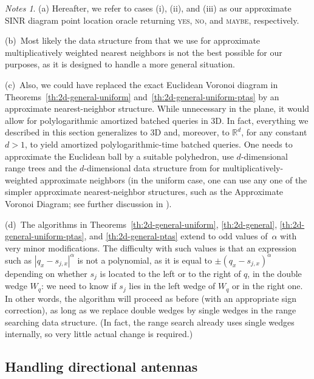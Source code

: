 \documentclass[11pt]{article}
\theoremstyle{remark}
\newtheorem*{notes}{Notes}
\newcommand{\Reals}{{\mathbb R}}
\begin{document}
\begin{notes}
  (a) Hereafter, we refer to cases (i), (ii), and (iii) as our approximate SINR diagram point location oracle returning \textsc{yes}, \textsc{no}, and \textsc{maybe}, respectively.

  (b)~Most likely the data structure from \cite{wann} that we use for approximate multiplicatively weighted nearest neighbors is not the best possible for our purposes, as it is designed to handle a more general situation.

  (c)~Also, we could have replaced the exact Euclidean Voronoi diagram in Theorems~\ref{th:2d-general-uniform} and~\ref{th:2d-general-uniform-ptas} by an approximate nearest-neighbor structure.  While unnecessary in the plane, it would allow for polylogarithmic amortized batched queries in 3D. In fact, everything we described in this section generalizes to 3D and, moreover, to $\Reals^d$, for any constant $d>1$, to yield amortized polylogarithmic-time batched queries.  One needs to approximate the Euclidean ball by a suitable polyhedron, use $d$-dimensional range trees and the $d$-dimensional data structure from \cite{wann} for multiplicatively-weighted approximate neighbors (in the uniform case, one can use any one of the simpler approximate nearest-neighbor structures, such as the Approximate Voronoi Diagram; see further discussion in \cite{wann}).

  (d)~The algorithms in Theorems~\ref{th:2d-general-uniform}, \ref{th:2d-general}, \ref{th:2d-general-uniform-ptas}, and \ref{th:2d-general-ptas} extend to odd values of~$\alpha$ with very minor modifications.  The difficulty with such values is that an expression such as $|q_x-s_{j,x}|^\alpha$ is not a polynomial, as it is equal to $\pm(q_x-s_{j,x})^\alpha$ depending on whether $s_j$ is located to the left or to the right of $q$, in the double wedge $W_q$: we need to know if $s_j$ lies in the left wedge of $W_q$ or in the right one.  In other words, the algorithm will proceed as before (with an appropriate sign correction), as long as we replace double wedges by single wedges in the range searching data structure.  (In fact, the range search already uses single wedges internally, so very little actual change is required.)
\end{notes}

\subsection{Handling directional antennas}
\label{sec:dir_antennas}
\end{document}
